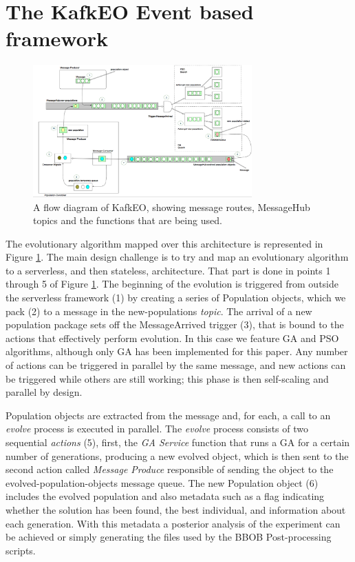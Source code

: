 \documentclass[sigconf]{acmart}
\begin{document}
\section{The KafkEO Event based framework}
\label{sec:methods}
%
\begin{figure}[h!tbp]
\includegraphics[width=0.75\textwidth]{img/kafkEO.png}
\caption{A flow diagram of KafkEO, showing message routes, MessageHub
  topics and the functions that are being used.}
\label{fig:kafkeo2}
\end{figure}
%

The evolutionary algorithm mapped over this architecture is
represented in Figure \ref{fig:kafkeo2}. The main
design challenge is to try and map an evolutionary algorithm to a
serverless, and then stateless, architecture. That part is done in
points 1 through 5 of Figure \ref{fig:kafkeo2}. The beginning of the
evolution is triggered from outside the serverless framework (1) by
creating a series of Population objects, which we pack (2) to a message in the
{\sf new-populations} {\em topic}. The arrival of a new population
package sets off the {\sf MessageArrived} trigger (3), that is bound to
the actions that effectively perform evolution. In this case we
feature GA and PSO algorithms, although only GA has been implemented
for this paper. Any number of actions can be triggered in parallel by the same message,
and new actions can be triggered while others are still working; this phase is
then self-scaling and parallel by design.

Population objects are extracted from the message and, for each, a call to
an {\em evolve} process is executed in parallel. The {\em evolve} process
consists of two sequential {\em actions} (5), first, the {\em GA Service} function that
runs a GA for a certain number of generations, producing a new evolved
object, which is then sent to the second action called {\em Message Produce}
 responsible of sending the object to the {\sf evolved-population-objects}
 message queue.  The new Population object (6) includes
 the evolved population and also metadata such as a flag indicating
whether the solution has been found, the best individual, and information
about each generation. With this metadata a posterior analysis of the experiment
can be achieved or simply generating the files used by the BBOB Post-processing scripts.
\end{document}
